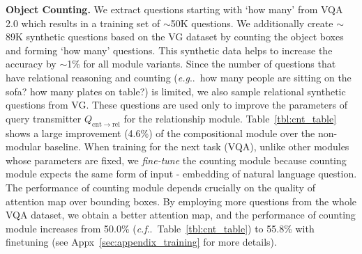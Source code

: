 \documentclass{article}
\makeatletter
\DeclareRobustCommand\onedot{\futurelet\@let@token\@onedot}
\def\@onedot{\ifx\@let@token.\else.\null\fi\xspace}
\def\eg{\emph{e.g}\onedot} \def\Eg{\emph{E.g}\onedot}
\def\cf{\emph{c.f}\onedot} \def\Cf{\emph{C.f}\onedot}
\makeatother
\begin{document}
\textbf{Object Counting.}\hspace{2mm}
We extract questions starting with `how many' from VQA 2.0 which results in a training set of $\sim$50K questions.
We additionally create $\sim$89K synthetic questions based on the VG dataset by counting the object boxes and forming `how many' questions.
This synthetic data helps to increase the accuracy by $\sim$1\% for all module variants. %
Since the number of questions that have relational reasoning and counting (\eg~how many people are sitting on the sofa? how many plates on table?) is limited, we also sample relational synthetic questions from VG.
These questions are used only to improve the parameters of query transmitter $Q_\mathrm{cnt\rightarrow rel}$ for the relationship module.
Table~\ref{tbl:cnt_table} shows a large improvement (4.6\%) of the compositional module over the non-modular baseline.
When training for the next task (VQA), unlike other modules whose parameters are fixed, we \emph{fine-tune} the counting module because counting module expects the same form of input - embedding of natural language question.
The performance of counting module depends crucially on the quality of attention map over bounding boxes.
By employing more questions from the whole VQA dataset, we obtain a better attention map, and the performance of counting module increases from 50.0\% (\cf~Table~\ref{tbl:cnt_table}) to 55.8\% with finetuning
(see Appx~\ref{sec:appendix_training} for more details).
\end{document}
